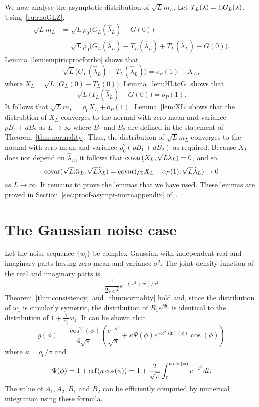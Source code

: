 \documentclass[journal]{IEEEtran}
\begin{document}
We now analyse the asymptotic distribution of $\sqrt{L} m_L$.  Let $T_L(\lambda) = {\mathbb E} G_L(\lambda)$.  Using~\eqref{eq:rhoGLZ},
\begin{align*}
\sqrt{L} m_L &= \sqrt{L} \rho_0 \big( G_L(\hat{\lambda}_L) - G(0) \big) \\
&= \sqrt{L} \rho_0 \big( G_L(\hat{\lambda}_L) - T_L(\hat{\lambda}_L) + T_L(\hat{\lambda}_L) - G(0) \big).
\end{align*}
Lemma~\ref{lem:empiricprocforrho} shows that 
\[
\sqrt{L}\big( G_L(\hat{\lambda}_L) - T_L(\hat{\lambda}_L)  \big) = o_P(1) + X_L,
\]
where $X_L = \sqrt{L}\big( G_L(0) - T_L(0)  \big)$.  Lemma~\ref{lem:HLtoG} shows that
\[
\sqrt{L}\big( T_L(\hat{\lambda}_L) - G(0) \big) = o_P(1).
\]
It follows that $\sqrt{L} m_L =  \rho_0 X_L + o_P(1)$.  Lemma~\ref{lem:XL} shows that the distrubtion of $X_L$ converges to the normal with zero mean and variance $p B_1 + d B_2$ as $L\rightarrow\infty$ where $B_1$ and $B_2$ are defined in the statement of Theorem~\ref{thm:normality}.  Thus, the distribution of $\sqrt{L} m_L$ converges to the normal with zero mean and variance $\rho_0^2(p B_1 + d B_2)$ as required.  Because $X_L$ does not depend on $\hat{\lambda}_L$, it follows that $\operatorname{covar}(X_L, \sqrt{L}\hat{\lambda}_L) = 0$, and so,
\[
\operatorname{covar}(\sqrt{L}\hat{m}_L, \sqrt{L}\hat{\lambda}_L) = \operatorname{covar}(\rho_0 X_L + o_P(1), \sqrt{L}\hat{\lambda}_L) \rightarrow 0
\]
as $L \rightarrow \infty$.  It remains to prove the lemmas that we have used.  These lemmas are proved in Section~\ref{sec:proof-asympt-normappendix} of~\cite{McKilliam_leastsqPSKpilotsdata_2012appendix}.



\section{The Gaussian noise case}\label{sec:gaussian-noise-case}

Let the noise sequence $\{w_i\}$ be complex Gaussian with independent real and imaginary parts having zero mean and variance $\sigma^2$.  The joint density function of the real and imaginary parts is
\[
\frac{1}{2\pi\sigma^2}e^{-(x^2 + y^2)/\sigma^2}
\]
Theorem~\ref{thm:consistency}~and~\ref{thm:normality} hold and, since the distribution of $w_1$ is circularly symetric, the distribution of $R_1e^{j\Phi_1}$ is identical to the distribution of $1 + \frac{1}{\rho_0} w_1$.
It can be shown that
\[
g(\phi) = \frac{\cos^2(\phi)}{4\sqrt{\pi}}\left( \frac{e^{-\kappa^2} }{\sqrt{\pi}} + \kappa \Psi(\phi)  e^{-\kappa^2\sin^2(\phi)}\cos(\phi) \right)
\]
where $\kappa = \rho_0/\sigma$ and
\[
\Psi(\phi) = 1 + \operatorname{erf}(\kappa \cos(\phi)) = 1 + \frac{2}{\sqrt{\pi}}\int_0^{\kappa \cos(\phi)} e^{-t^2} dt .
\]
The value of $A_1, A_2, B_1$ and $B_2$ can be efficiently computed by numerical integration using these formula.
\end{document}
